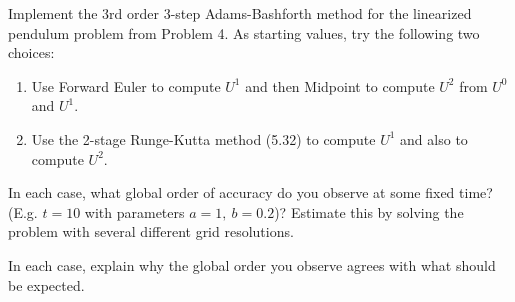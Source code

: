 \documentclass[10pt]{article}
\begin{document}
Implement the 3rd order 3-step Adams-Bashforth method for the linearized
pendulum problem from Problem 4.  As starting values, try the
following two choices:

\begin{enumerate} 
\item Use Forward Euler to compute $U^1$ and then Midpoint to compute $U^2$
from $U^0$ and $U^1$.

\item Use the 2-stage Runge-Kutta method (5.32) to compute $U^1$ and also to
compute $U^2$.
\end{enumerate}

In each case, what global order of accuracy do you observe at some fixed
time? (E.g. $t=10$ with parameters $a=1,~b=0.2$)?  Estimate this by solving
the problem with several different grid resolutions.

In each case, explain why the global order you observe agrees with what
should be expected.


\end{document}
